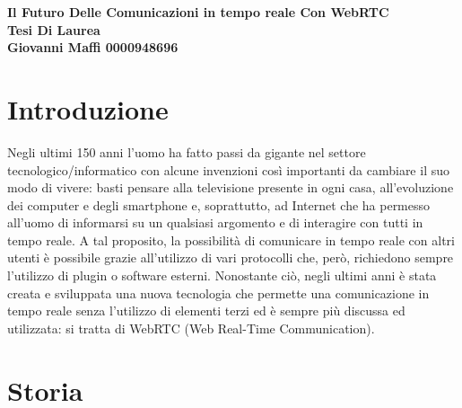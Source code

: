 \documentclass[11pt, a4paper, openany]{book}
\newcommand\blankpage{%
	\null
	\thispagestyle{empty}%
	\addtocounter{page}{-1}%
	\newpage}
\begin{document}
		
	\begin{titlepage}
		\centering
		\vfill
		{\bfseries\Large
			\huge Il Futuro Delle Comunicazioni in tempo reale Con WebRTC \\
			\vskip0.4cm
			\normalfont	\LARGE Tesi Di Laurea \\
			 Giovanni Maffi 0000948696
			\vskip0.7cm
		}    

		\vfill
		\vfill
	\end{titlepage}
	\afterpage{\blankpage}
	
	\tableofcontents 
	
	\afterpage{\blankpage}
	
	\chapter{Introduzione}
	
	Negli ultimi 150 anni l'uomo ha fatto passi da gigante nel settore tecnologico/informatico con alcune invenzioni così importanti da cambiare il suo modo di vivere: basti pensare alla televisione presente in ogni casa, all'evoluzione dei computer e degli smartphone e, soprattutto, ad Internet che ha permesso all'uomo di informarsi su un qualsiasi argomento e di interagire con tutti in tempo reale. A tal proposito, la possibilità di comunicare in tempo reale con altri utenti è possibile grazie all'utilizzo di vari protocolli che, però, richiedono sempre l'utilizzo di plugin o software esterni. Nonostante ciò, negli ultimi anni è stata creata e sviluppata una nuova tecnologia che permette una comunicazione in tempo reale senza l'utilizzo di elementi terzi ed è sempre più discussa ed utilizzata: si tratta di WebRTC (Web Real-Time Communication).

 	\afterpage{\blankpage}
 	\chapter{Storia}
\end{document}
